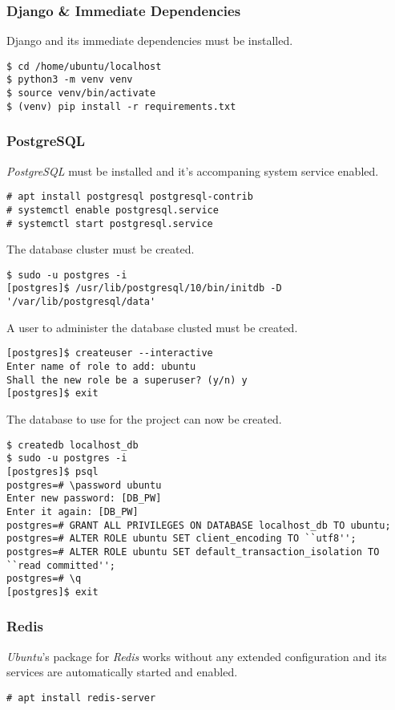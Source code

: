 \subsubsection{Django \& Immediate Dependencies}

Django and its immediate dependencies must be installed.
\begin{lstlisting}
$ cd /home/ubuntu/localhost
$ python3 -m venv venv
$ source venv/bin/activate
$ (venv) pip install -r requirements.txt
\end{lstlisting}

\subsubsection{PostgreSQL}

\emph{PostgreSQL} must be installed and it's accompaning system service enabled.
\begin{lstlisting}
# apt install postgresql postgresql-contrib
# systemctl enable postgresql.service
# systemctl start postgresql.service
\end{lstlisting}
The database cluster must be created.
\begin{lstlisting}
$ sudo -u postgres -i
[postgres]$ /usr/lib/postgresql/10/bin/initdb -D '/var/lib/postgresql/data'
\end{lstlisting}
A user to administer the database clusted must be created.
\begin{lstlisting}
[postgres]$ createuser --interactive
Enter name of role to add: ubuntu
Shall the new role be a superuser? (y/n) y
[postgres]$ exit
\end{lstlisting}
The database to use for the project can now be created.
\begin{lstlisting}
$ createdb localhost_db
$ sudo -u postgres -i
[postgres]$ psql
postgres=# \password ubuntu
Enter new password: [DB_PW]
Enter it again: [DB_PW]
postgres=# GRANT ALL PRIVILEGES ON DATABASE localhost_db TO ubuntu;
postgres=# ALTER ROLE ubuntu SET client_encoding TO ``utf8'';
postgres=# ALTER ROLE ubuntu SET default_transaction_isolation TO ``read committed'';
postgres=# \q
[postgres]$ exit
\end{lstlisting}

\subsubsection{Redis}

\emph{Ubuntu}'s package for \emph{Redis} works without any extended configuration and its services are automatically started and enabled.
\begin{lstlisting}
# apt install redis-server
\end{lstlisting}

